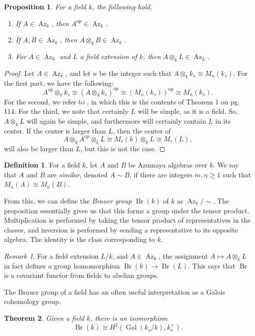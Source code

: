 \documentclass[12pt,twoside]{reedthesis}
\theoremstyle{plain}
\newtheorem{theorem}{Theorem}[chapter]
\newtheorem{proposition}[theorem]{Proposition}
\theoremstyle{definition}
\newtheorem{definition}{Definition}[section]
\theoremstyle{remark}
\newtheorem{remark}{Remark}[section]
\newcommand{\Br}{\operatorname{Br}}
\newcommand{\Az}{\operatorname{Az}}
\newcommand{\op}{^{\text{op}}}
\newcommand{\Gal}{\operatorname{Gal}}
\begin{document}
\begin{proposition} For a field $k$, the following hold.
\begin{enumerate} 
\item If $A\in\Az_k$, then $A\op\in\Az_k$.
\item If $A,B\in\Az_k$, then $A\otimes_k B\in\Az_k$.
\item For $A\in\Az_k$ and $L$ a field extension of $k$, then $A\otimes_k L\in\Az_L$.
\end{enumerate}
\end{proposition}
\begin{proof}
Let $A\in\Az_k$, and let $n$ be the integer such that $A\otimes_k k_s\cong M_n(k_s)$. For the first part, we have the following:
\[
A\op\otimes_k k_s\cong(A\otimes_k k_s)\op\cong(M_n(k_s))\op\cong M_n(k_s).
\]
For the second, we refer to \cite{jacobson}, in which this is the contents of Theorem 1 on pg. 114. For the third, we note that certainly $L$ will be simple, as it is a field. So, $A\otimes_k L$ will again be simple, and furthermore will certainly contain $L$ in its center. If the center is larger than $L$, then the center of 
\[
A\otimes_k A\op\otimes_k L\cong M_r(k)\otimes_k L\cong M_r(L),
\]
will also be larger than $L$, but this is not the case.
\end{proof}
\begin{definition}
For a field $k$, let $A$ and $B$ be Azumaya algebras over $k$. We say that $A$ and $B$ are \emph{similar}, denoted $A\sim B$, if there are integers $m,n\geq1$ such that $M_n(A)\cong M_n(B)$.
\end{definition}
\noindent From this, we can define the \emph{Brauer group} $\Br(k)$ of $k$ as $\Az_k/\sim$. The proposition essentially gives us that this forms a group under the tensor product. Multiplication is performed by taking the tensor product of representatives in the classes, and inversion is performed by sending a representative to its opposite algebra. The identity is the class corresponding to $k$.
\begin{remark}\label{covariantBr}
For a field extension $L/k$, and $A\in\Az_k$, the assignment $A\mapsto A\otimes_k L$ in fact defines a group homomorphism $\Br(k)\to \Br(L)$. This says that $\Br$ is a covariant functor from fields to abelian groups.
\end{remark}
The Brauer group of a field has an often useful interpretation as a Galois cohomology group.
\begin{theorem}
Given a field $k$, there is an isomorphism 
\[
\Br(k)\cong H^2(\Gal(k_s/k),k_s^\times).
\]
\end{theorem}
\end{document}
